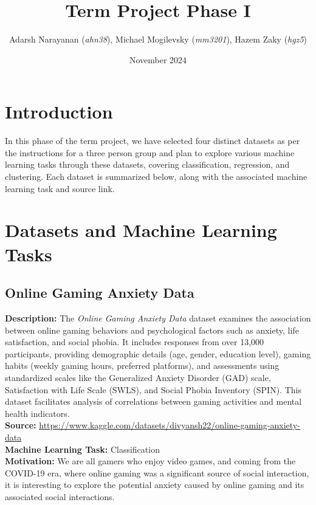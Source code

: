 \documentclass{article}
\title{Term Project Phase I}
\author{Adarsh Narayanan (\textit{ahn38}), Michael Mogilevsky (\textit{mm3201}), Hazem Zaky (\textit{hgz5})}
\date{November 2024}
\begin{document}
\maketitle

\section{Introduction}

In this phase of the term project, we have selected four distinct datasets as per the instructions for a three person group and plan to explore various machine learning tasks through these datasets, covering classification, regression, and clustering. Each dataset is summarized below, along with the associated machine learning task and source link.

\section{Datasets and Machine Learning Tasks} 

\vspace{0.4cm}

\subsection{Online Gaming Anxiety Data}
\textbf{Description:} The \textit{Online Gaming Anxiety Data} dataset examines the association between online gaming behaviors and psychological factors such as anxiety, life satisfaction, and social phobia. It includes responses from over 13,000 participants, providing demographic details (age, gender, education level), gaming habits (weekly gaming hours, preferred platforms), and assessments using standardized scales like the Generalized Anxiety Disorder (GAD) scale, Satisfaction with Life Scale (SWLS), and Social Phobia Inventory (SPIN). This dataset facilitates analysis of correlations between gaming activities and mental health indicators. \\

\textbf{Source:} \href{https://www.kaggle.com/datasets/divyansh22/online-gaming-anxiety-data}{https://www.kaggle.com/datasets/divyansh22/online-gaming-anxiety-data}\\

\textbf{Machine Learning Task:} Classification \\

\textbf{Motivation:} We are all gamers who enjoy video games, and coming from the COVID-19 era, where online gaming was a significant source of social interaction, it is interesting to explore the potential anxiety caused by online gaming and its associated social interactions. \\
\end{document}
